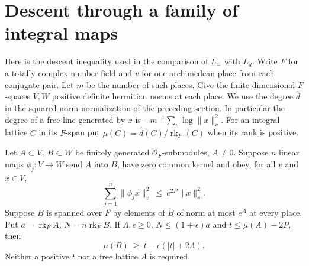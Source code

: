 \section{Descent through a family of integral maps}
\label{sec:map-descent}

Here is the descent inequality used in the comparison of \(L_-\)
with \(L_d\). Write \(F\) for a totally complex number field and
\(v\) for one archimedean place from each conjugate pair. Let \(m\)
be the number of such places. Give the finite-dimensional \(F\)-spaces
\(V,W\) positive definite hermitian norms at each place. We use
the degree \(\widehat d\) in the squared-norm normalization of the
preceding section. In particular the degree of a free line generated
by \(x\) is \(-m^{-1}\sum_v\log\|x\|_v^2\). For an integral lattice
\(C\) in its \(F\)-span put
\(\mu(C)=\widehat d(C)/\operatorname{rk}_F(C)\) when its rank is positive.

Let \(A\subset V,\ B\subset W\) be finitely generated
\(\mathcal O_F\)-submodules, \(A\ne0\). Suppose \(n\) linear maps
\(\phi_j:V\to W\) send \(A\) into \(B\), have zero common kernel and
obey, for all \(v\) and \(x\in V\),
\begin{equation}
 \sum_{j=1}^n\|\phi_jx\|_v^2\ \le\ e^{2P}\|x\|_v^2 .
 \label{eq:descent-map-bound}
\end{equation}
Suppose \(B\) is spanned over \(F\) by elements of \(B\) of norm at
most \(e^\Lambda\) at every place. Put \(a=\operatorname{rk}_F A\),
\(N=n\operatorname{rk}_F B\). If \(\Lambda,\epsilon\ge0\),
\(N\le(1+\epsilon)a\) and \(t\le\mu(A)-2P\), then
\begin{equation}
                  \mu(B)\ \ge\ t-\epsilon(|t|+2\Lambda).
 \label{eq:descent-result}
\end{equation}
Neither a positive \(t\) nor a free lattice \(A\) is required.


